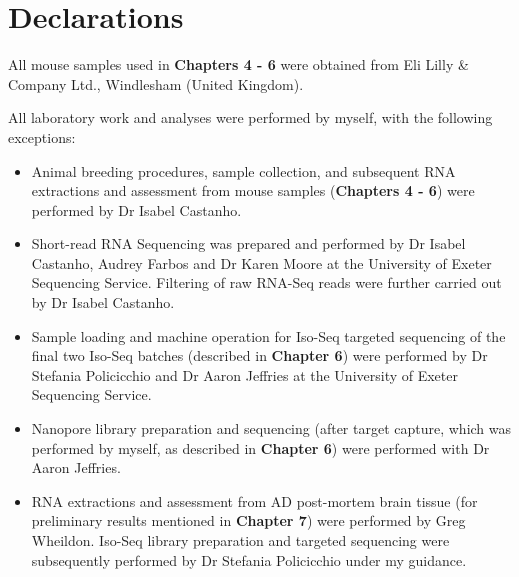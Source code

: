 \chapter*{Declarations}

All mouse samples used in \textbf{Chapters 4 - 6}  were obtained from Eli Lilly \& Company Ltd., Windlesham (United Kingdom). 

All laboratory work and analyses were performed by myself, with the following exceptions:
\begin{itemize}
	\item Animal breeding procedures, sample collection, and subsequent RNA extractions and assessment from mouse samples (\textbf{Chapters 4 - 6}) were performed by Dr Isabel Castanho.
	\item Short-read RNA Sequencing was prepared and performed by Dr Isabel Castanho, Audrey Farbos and Dr Karen Moore at the University of Exeter Sequencing Service. Filtering of raw RNA-Seq reads were further carried out by Dr Isabel Castanho.
	\item Sample loading and machine operation for Iso-Seq targeted sequencing of the final two Iso-Seq batches (described in \textbf{Chapter 6}) were performed by Dr Stefania Policicchio and Dr Aaron Jeffries at the University of Exeter Sequencing Service.  
	\item Nanopore library preparation and sequencing (after target capture, which was performed by myself, as described in \textbf{Chapter 6}) were performed with Dr Aaron Jeffries. 	
	\item RNA extractions and assessment from AD post-mortem brain tissue (for preliminary results mentioned in \textbf{Chapter 7}) were performed by Greg Wheildon. Iso-Seq library preparation and targeted sequencing were subsequently performed by Dr Stefania Policicchio under my guidance.
\end{itemize}